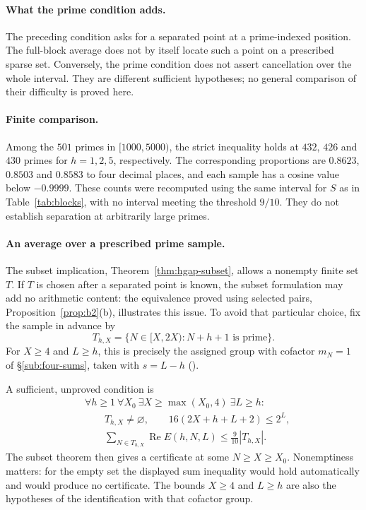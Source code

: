 \documentclass[11pt]{article}
\theoremstyle{plain}
\theoremstyle{definition}
\theoremstyle{remark}
\newcommand{\lean}[2]{\leanlink{#2}}
\begin{document}
\paragraph{What the prime condition adds.}
The preceding condition asks for a separated point at a prime-indexed
position. The full-block average does not by itself locate such a point
on a prescribed sparse set. Conversely, the prime condition does not
assert cancellation over the whole interval. They are different
sufficient hypotheses; no general comparison of their difficulty is
proved here.

\paragraph{Finite comparison.}
Among the $501$ primes in $[1000,5000)$, the strict inequality holds
at $432$, $426$ and $430$ primes for $h=1,2,5$, respectively. The
corresponding proportions are $0.8623$, $0.8503$ and $0.8583$ to four
decimal places, and each sample has a cosine value below $-0.9999$.
These counts were recomputed using the same interval for $S$ as in
Table~\ref{tab:blocks}, with no interval meeting the threshold $9/10$.
They do not establish separation at arbitrarily large primes.

\paragraph{An average over a prescribed prime sample.}
The subset implication, Theorem~\ref{thm:hgap-subset},
allows a nonempty finite set $T$. If $T$ is chosen after a separated
point is known, the subset formulation may add no arithmetic content:
the equivalence proved using selected pairs,
Proposition~\ref{prop:b2}(b), illustrates this issue.
To avoid that particular choice, fix the sample in advance by
\[
 T_{h,X}=\{N\in[X,2X):N+h+1\text{ is prime}\}.
\]
For $X\ge4$ and $L\ge h$, this is precisely the assigned group with
cofactor $m_N=1$ of \S\ref{sub:four-sums}, taken with $s=L-h$
(\lean{Erdos249257.\allowbreak TotientTailPeriodKiller.\allowbreak mem_pivotFiber_\allowbreak one_overlap_iff}{FirstHarmonicPivot.lean:423}).

A sufficient, unproved condition is
\begin{equation}\label{eq:primefibre}
\begin{aligned}
 &\forall h\ge1\ \forall X_0\ \exists X\ge\max(X_0,4)\ \exists L\ge h:\\
 &\qquad T_{h,X}\ne\varnothing,\qquad
          16(2X+h+L+2)\le2^L,\\
 &\qquad \sum_{N\in T_{h,X}}\operatorname{Re}E(h,N,L)
       \le\frac9{10}|T_{h,X}|.
\end{aligned}
\end{equation}
The subset theorem then gives a certificate at some $N\ge X\ge X_0$.
Nonemptiness matters: for the empty set the displayed sum inequality
would hold automatically and would produce no certificate. The bounds
$X\ge4$ and $L\ge h$ are also the hypotheses of the identification with
that cofactor group.
\end{document}
